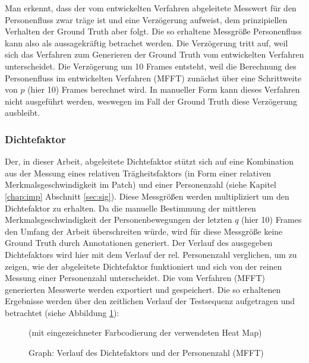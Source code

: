Man erkennt, dass der vom entwickelten Verfahren abgeleitete Messwert für den Personenfluss zwar träge ist und eine Verzögerung aufweist, dem prinzipiellen Verhalten der Ground Truth aber folgt. Die so erhaltene Messgröße Personenfluss kann also als aussagekräftig betrachet werden. Die Verzögerung tritt auf, weil sich das Verfahren zum Generieren der Ground Truth vom entwickelten Verfahren unterscheidet. Die Verzögerung um 10 Frames entsteht, weil die Berechnung des Personenfluss im entwickelten Verfahren (MFFT) zunächst über eine Schrittweite von $p$ (hier 10) Frames berechnet wird. In manueller Form kann dieses Verfahren nicht ausgeführt werden, weswegen im Fall der Ground Truth diese Verzögerung ausbleibt.

\subsubsection{Dichtefaktor}
\label{dispersion_dichte}
Der, in dieser Arbeit, abgeleitete Dichtefaktor stützt sich auf eine Kombination aus der Messung eines relativen Trägheitsfaktors (in Form einer relativen Merkmalsgeschwindigkeit im Patch) und einer Personenzahl (siehe Kapitel \ref{chap:imp} Abschnitt \ref{sec:sig}). 
\newpage
Diese Messgrößen werden multipliziert um den Dichtefaktor zu erhalten. Da die manuelle Bestimmung der mittleren Merkmalsgeschwindigkeit der Personenbewegungen der letzten $q$ (hier 10) Frames den Umfang der Arbeit überschreiten würde, wird für diese Messgröße keine Ground Truth durch Annotationen generiert. Der Verlauf des ausgegeben Dichtefaktors wird hier mit dem Verlauf der rel. Personenzahl verglichen, um zu zeigen, wie der abgeleitete Dichtefaktor funktioniert und sich von der reinen Messung einer Personenzahl unterscheidet. Die vom Verfahren (MFFT) generierten Messwerte werden exportiert und gespeichert. Die so erhaltenen Ergebnisse werden über den zeitlichen Verlauf der Testsequenz aufgetragen und betrachtet (siehe Abbildung \ref{dichte}):
\vskip 10pt
\begin{figure}[h]
  \centering
  \caption{Graph: Verlauf des Dichtefaktors und der Personenzahl (MFFT) \cite{CourtyPRL2014} \cite{Allain2012ICPR}}
  (mit eingezeichneter Farbcodierung der verwendeten Heat Map)
  \label{dichte}
\end{figure}
\bigskip

